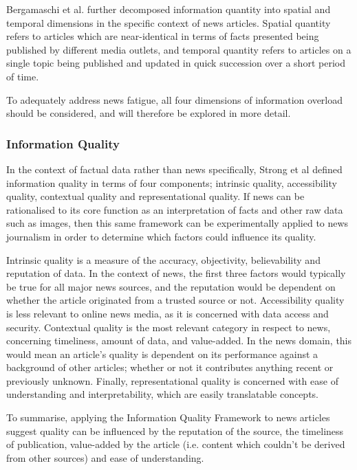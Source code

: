 Bergamaschi et al.\citep{GuestEditorsIntroductionInformationOverload} further decomposed information quantity into spatial and temporal dimensions in the specific context of news articles. Spatial quantity refers to articles which are near-identical in terms of facts presented being published by different media outlets, and temporal quantity refers to articles on a single topic being published and updated in quick succession over a short period of time.

To adequately address news fatigue, all four dimensions of information overload should be considered, and will therefore be explored in more detail.

\subsubsection{Information Quality}
In the context of factual data rather than news specifically, Strong et al \citep{DataQualityInContext} defined information quality in terms of four components; intrinsic quality, accessibility quality, contextual quality and representational quality. If news can be rationalised to its core function as an interpretation of facts and other raw data such as images, then this same framework can be experimentally applied to news journalism in order to determine which factors could influence its quality.

Intrinsic quality is a measure of the accuracy, objectivity, believability and reputation of data. In the context of news, the first three factors would typically be true for all major news sources, and the reputation would be dependent on whether the article originated from a trusted source or not. Accessibility quality is less relevant to online news media, as it is concerned with data access and security. Contextual quality is the most relevant category in respect to news, concerning timeliness, amount of data, and value-added. In the news domain, this would mean an article's quality is dependent on its performance against a background of other articles; whether or not it contributes anything recent or previously unknown. Finally, representational quality is concerned with ease of understanding and interpretability, which are easily translatable concepts.

To summarise, applying the Information Quality Framework\citep{DataQualityInContext} to news articles suggest quality can be influenced by the reputation of the source, the timeliness of publication, value-added by the article (i.e. content which couldn't be derived from other sources) and ease of understanding.


